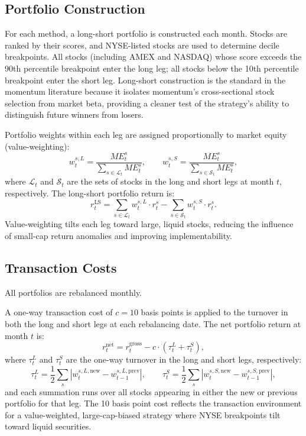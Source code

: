 \subsection{Portfolio Construction}\label{app:portfolio_construction}

For each method, a long-short portfolio is constructed each month. Stocks are ranked by their scores, and NYSE-listed stocks are used to determine decile breakpoints. All stocks (including AMEX and NASDAQ) whose score exceeds the 90th percentile breakpoint enter the long leg; all stocks below the 10th percentile breakpoint enter the short leg. Long-short construction is the standard in the momentum literature \citep{JegadeeshTitman1993, DanielMoskowitz2016, BarrosoSantaClara2015} because it isolates momentum's cross-sectional stock selection from market beta, providing a cleaner test of the strategy's ability to distinguish future winners from losers.

Portfolio weights within each leg are assigned proportionally to market equity (value-weighting):
\begin{equation}
    w_t^{s,L} = \frac{ME_t^s}{\sum_{s \in \mathcal{L}_t} ME_t^s}, \qquad w_t^{s,S} = \frac{ME_t^s}{\sum_{s \in \mathcal{S}_t} ME_t^s},
\end{equation}
where $\mathcal{L}_t$ and $\mathcal{S}_t$ are the sets of stocks in the long and short legs at month $t$, respectively. The long-short portfolio return is:
\begin{equation}
    r_t^{\text{LS}} = \sum_{s \in \mathcal{L}_t} w_t^{s,L} \cdot r_t^s - \sum_{s \in \mathcal{S}_t} w_t^{s,S} \cdot r_t^s.
\end{equation}
Value-weighting tilts each leg toward large, liquid stocks, reducing the influence of small-cap return anomalies and improving implementability.

\subsection{Transaction Costs}\label{app:transaction_costs}

All portfolios are rebalanced monthly.

A one-way transaction cost of $c = 10$ basis points is applied to the turnover in both the long and short legs at each rebalancing date. The net portfolio return at month $t$ is:
\begin{equation}
    r_t^{\text{net}} = r_t^{\text{gross}} - c \cdot (\tau_t^L + \tau_t^S),
\end{equation}
where $\tau_t^L$ and $\tau_t^S$ are the one-way turnover in the long and short legs, respectively:
\begin{equation}
    \tau_t^L = \frac{1}{2} \sum_{s} \left|w_{t}^{s,L,\text{new}} - w_{t-1}^{s,L,\text{prev}}\right|, \qquad \tau_t^S = \frac{1}{2} \sum_{s} \left|w_{t}^{s,S,\text{new}} - w_{t-1}^{s,S,\text{prev}}\right|,
\end{equation}
and each summation runs over all stocks appearing in either the new or previous portfolio for that leg. The 10 basis point cost reflects the transaction environment for a value-weighted, large-cap-biased strategy where NYSE breakpoints tilt toward liquid securities.

